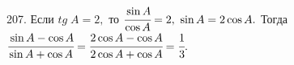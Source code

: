 207. Если $tg\; A=2,$ то $\cfrac{\sin A}{\cos A}=2,\ \sin A=2\cos A.$ Тогда $\cfrac{\sin A -\cos A}{\sin A +\cos A}=\cfrac{2\cos A -\cos A}{2\cos A +\cos A}=\cfrac{1}{3}.$\\
